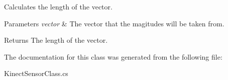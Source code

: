 Calculates the length of the vector. 


\begin{DoxyParams}{Parameters}
{\em vector} & The vector that the magitudes will be taken from. \\
\hline
\end{DoxyParams}
\begin{DoxyReturn}{Returns}
The length of the vector. 
\end{DoxyReturn}


The documentation for this class was generated from the following file\+:\begin{DoxyCompactItemize}
\item 
Kinect\+Sensor\+Class.\+cs\end{DoxyCompactItemize}
